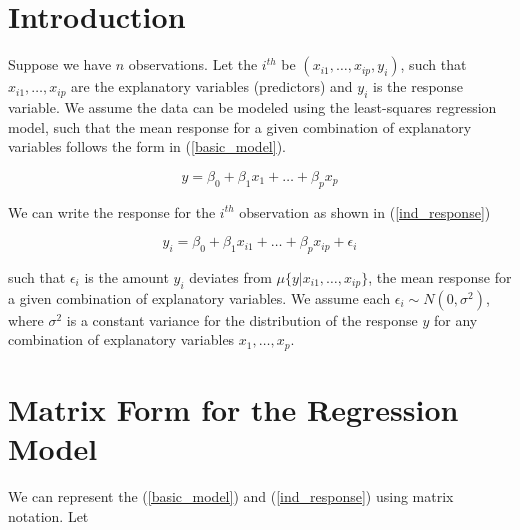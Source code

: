 \documentclass[]{book}
\begin{document}
\section{Introduction}\label{introduction-2}

Suppose we have \(n\) observations. Let the \(i^{th}\) be
\((x_{i1}, \ldots, x_{ip}, y_i)\), such that \(x_{i1}, \ldots, x_{ip}\)
are the explanatory variables (predictors) and \(y_i\) is the response
variable. We assume the data can be modeled using the least-squares
regression model, such that the mean response for a given combination of
explanatory variables follows the form in (\ref{basic_model}).

\begin{equation}
\label{basic_model}
y = \beta_0 + \beta_1 x_1 + \dots + \beta_p x_p 
\end{equation}

We can write the response for the \(i^{th}\) observation as shown in
(\ref{ind_response})

\begin{equation}
\label{ind_response}
y_i = \beta_0 + \beta_1 x_{i1} + \dots + \beta_p x_{ip} + \epsilon_i 
\end{equation}

such that \(\epsilon_i\) is the amount \(y_i\) deviates from
\(\mu\{y|x_{i1}, \ldots, x_{ip}\}\), the mean response for a given
combination of explanatory variables. We assume each
\(\epsilon_i \sim N(0,\sigma^2)\), where \(\sigma^2\) is a constant
variance for the distribution of the response \(y\) for any combination
of explanatory variables \(x_1, \ldots, x_p\).

\section{Matrix Form for the Regression
Model}\label{matrix-form-for-the-regression-model-1}

We can represent the (\ref{basic_model}) and (\ref{ind_response}) using
matrix notation. Let
\end{document}
